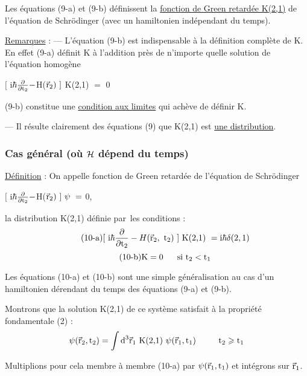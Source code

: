 Les équations (9-a) et (9-b) définissent la \ul{fonction de Green retardée
K(2,1)} de l'équation de Schrödinger (avec un hamiltonien indépendant
du temps).

\ul{Remarques} :
— L'équation (9-b) est indispensable à la définition complète de K. En
effet (9-a) définit K à l'addition près de n'importe quelle solution de
l'équation homogène
\begin{center}
$[$ i$\hbar\frac{\partial}{\partial\text{t}_2}-$H($\vec{\text{r}}_2)\ ]$ K(2,1) $=$ 0
\end{center}

(9-b) constitue une \ul{condition aux limites} qui achève de définir K.

— Il résulte clairement des équations (9) que K(2,1) est \ul{une distribution}.

\subsubsection{Cas général (où $\mathcal{H}$ dépend du temps)}%
\ul{Définition} : On appelle fonction de Green retardée de l'équation de
Schrödinger
\begin{center}
$[$ i$\hbar\frac{\partial}{\partial\text{t}_2}-$H($\vec{\text{r}}_2)\ ]\ \psi\ =$ 0,
\end{center}
la distribution K(2,1) définie par les
conditions :
\[
\tag{10-a}[\mt{ i}\hbar\frac{\partial}{\partial\mt{t}_2}-H(\vec{\mt{r}}_2,\mt{ t}_2)\ ]\mt{ K(2,1) }=
\mt{i}\hbar\delta(2,1)
\]
\[
\tag{10-b}\text{K}=0\ \ \ \ \ \text{si t}_2<\text{t}_1
\]

Les équations (10-a) et (10-b) sont une simple généralisation
au cas d'un hamiltonien dérendant du temps des équations (9-a) et (9-b).

Montrons que la solution K(2,1) de ce système satisfait à la
propriété fondamentale (2) :
\[
\psi(\vec{\text{r}}_2,\text{t}_2)=\int\text{d}^3\vec{\text{r}}_1\text{ K(2,1) }\psi(\vec{\text{r}}_1,\text{t}_1)
\ \ \ \ \ \ \ \ \text{t}_2\geqslant\text{t}_1
\]

Multiplions pour cela membre à membre (10-a) par $\psi(\vec{\text{r}}_1,\text{t}_1)$ et intégrons
sur $\vec{\text{r}}_1$.

